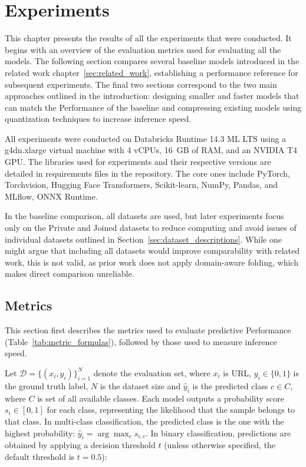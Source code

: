 \chapter{Experiments}

This chapter presents the results of all the experiments that were conducted. It begins with an overview of the evaluation metrics used for evaluating all the models. The following section compares several baseline models introduced in the related work chapter~\ref{sec:related_work}, establishing a performance reference for subsequent experiments. The final two sections correspond to the two main approaches outlined in the introduction: designing smaller and faster models that can match the Performance of the baseline and compressing existing models using quantization techniques to increase inference speed.

All experiments were conducted on Databricks Runtime 14.3 ML LTS using a g4dn.xlarge virtual machine with 4 vCPUs, 16~GB of RAM, and an NVIDIA T4 GPU. The libraries used for experiments and their respective versions are detailed in requirements files in the repository. The core ones include PyTorch, Torchvision, Hugging Face Transformers, Scikit-learn, NumPy, Pandas, and MLflow, ONNX Runtime.

In the baseline comparison, all datasets are used, but later experiments focus only on the Private and Joined datasets to reduce computing and avoid issues of individual datasets outlined in Section~\ref{sec:dataset_descriptions}. While one might argue that including all datasets would improve comparability with related work, this is not valid, as prior work does not apply domain-aware folding, which makes direct comparison unreliable.

\section{Metrics}
\label{sec:metrics}
This section first describes the metrics used to evaluate predictive Performance (Table~\ref{tab:metric_formulas}), followed by those used to measure inference speed.

Let $\mathcal{D} = \{(x_i, y_i)\}_{i=1}^{N}$ denote the evaluation set, where $x_i$ is URL, $y_i \in \{0, 1\}$ is the ground truth label, $N$ is the dataset size and $\hat{y}_i$ is the predicted class $c \in C$, where $C$ is set of all available classes. Each model outputs a probability score $s_i \in [0, 1]$ for each class, representing the likelihood that the sample belongs to that class. In multi-class classification, the predicted class is the one with the highest probability: $\hat{y}_i = \arg\max_c s_{i,c}$. In binary classification, predictions are obtained by applying a decision threshold $t$ (unless otherwise specified, the default threshold is $t = 0.5$):


